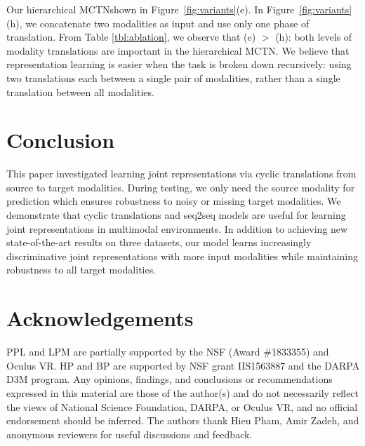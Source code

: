 \documentclass[letterpaper]{article} %
\newcommand{\ours}{MCTN}
\begin{document}
Our hierarchical \ours \is shown in Figure~\ref{fig:variants}(e). In Figure~\ref{fig:variants}(h), we concatenate two modalities as input and use only one phase of translation. From Table \ref{tbl:ablation}, we observe that (e) $>$ (h): both levels of modality translations are important in the hierarchical \ours. We believe that representation learning is easier when the task is broken down recursively: using two translations each between a single pair of modalities, rather than a single translation between all modalities.

\section{Conclusion}
This paper investigated learning joint representations via cyclic translations from source to target modalities. During testing, we only need the source modality for prediction which ensures robustness to noisy or missing target modalities. We demonstrate that cyclic translations and seq2seq models are useful for learning joint representations in multimodal environments. In addition to achieving new state-of-the-art results on three datasets, our model learns increasingly discriminative joint representations with more input modalities while maintaining robustness to all target modalities.

\section{Acknowledgements}
PPL and LPM are partially supported by the NSF (Award \#1833355) and Oculus VR. HP and BP are supported by NSF grant IIS1563887 and the DARPA
D3M program. Any opinions, findings, and conclusions or recommendations expressed in this material are those of the author(s) and do not necessarily reflect the views of National Science Foundation, DARPA, or Oculus VR, and no official endorsement should be inferred. The authors thank Hieu Pham, Amir Zadeh, and anonymous reviewers for useful discussions and feedback. 

\end{document}
